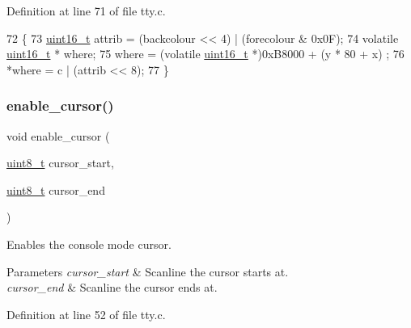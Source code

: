 Definition at line 71 of file tty.\+c.


\begin{DoxyCode}
72 \{
73      \hyperlink{a00140_a273cf69d639a59973b6019625df33e30_a273cf69d639a59973b6019625df33e30}{uint16\_t} attrib = (backcolour << 4) | (forecolour & 0x0F);
74      \textcolor{keyword}{volatile} \hyperlink{a00140_a273cf69d639a59973b6019625df33e30_a273cf69d639a59973b6019625df33e30}{uint16\_t} * where;
75      where = (\textcolor{keyword}{volatile} \hyperlink{a00140_a273cf69d639a59973b6019625df33e30_a273cf69d639a59973b6019625df33e30}{uint16\_t} *)0xB8000 + (y * 80 + x) ;
76      *where = c | (attrib << 8);
77 \}
\end{DoxyCode}
\mbox{\label{a00182_afe197dc4dbfa6036ef04abd2aeeeca2d_afe197dc4dbfa6036ef04abd2aeeeca2d}} 
\subsubsection{\texorpdfstring{enable\+\_\+cursor()}{enable\_cursor()}}
{\footnotesize\ttfamily void enable\+\_\+cursor (\begin{DoxyParamCaption}\item[{\hyperlink{a00140_aba7bc1797add20fe3efdf37ced1182c5_aba7bc1797add20fe3efdf37ced1182c5}{uint8\+\_\+t}}]{cursor\+\_\+start,  }\item[{\hyperlink{a00140_aba7bc1797add20fe3efdf37ced1182c5_aba7bc1797add20fe3efdf37ced1182c5}{uint8\+\_\+t}}]{cursor\+\_\+end }\end{DoxyParamCaption})}



Enables the console mode cursor. 


\begin{DoxyParams}{Parameters}
{\em cursor\+\_\+start} & Scanline the cursor starts at. \\
\hline
{\em cursor\+\_\+end} & Scanline the cursor ends at. \\
\hline
\end{DoxyParams}


Definition at line 52 of file tty.\+c.


